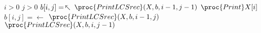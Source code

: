 \begin{codebox}
\li \If $i > 0$  $j > 0$
\li \Then \If $b[i,j] = \arrow{3}$
\li     \Then 
            $\proc{PrintLCSrec}(X,b,i-1,j-1)$
\li         $\proc{Print} X[i]$
\li     \Else \If $b[i,j] = \leftarrow$
\li         $\proc{PrintLCSrec}(X,b,i-1,j)$
\li     \Else
\li         $\proc{PrintLCSrec}(X,b,i,j-1)$
        \End
    \End
\end{codebox}